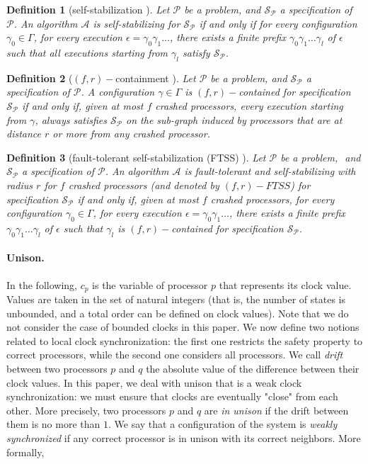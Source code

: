 \documentclass[11pt,english,letterpaper]{article}
\newtheorem{definition}{Definition}
\begin{document}
\begin{definition} [self-stabilization \cite{D74j}] \label{def:self}
Let $\mathcal{P}$ be a problem, and $\mathcal{\mathcal{S}_{P}}$ a specification of $\mathcal{P}$. An algorithm $\mathcal{A}$ is self-stabilizing for $\mathcal{S_{P}}$ if and only if for every configuration  $\gamma_{0}\in\Gamma$, for every execution $\epsilon=\gamma_{0}\gamma_{1}\ldots$, there exists a finite prefix $\gamma_{0}\gamma_{1}\ldots\gamma_{l}$ of $\epsilon$ such that all executions starting from $\gamma_{l}$ satisfy $\mathcal{S_{P}}$.
\end{definition}

\begin{definition} [$(f,r)-$containment \cite{NA02c}]
Let $\mathcal{P}$ be a problem, and $\mathcal{\mathcal{S}_{P}}$ a specification of $\mathcal{P}$. A configuration $\gamma\in\Gamma$ is $(f,r)-$contained for specification $\mathcal{\mathcal{S}_{P}}$ if and only if, given at most $f$ crashed processors, every execution starting from $\gamma$, always satisfies $\mathcal{\mathcal{S}_{P}}$ on the sub-graph induced by processors that are at distance $r$ or more from any crashed processor.
\end{definition}

\begin{definition} [fault-tolerant self-stabilization (FTSS) \cite{AH93c,GP93c}] \label{def:ftss}
Let $\mathcal{P}$ be a problem, $ $ and $\mathcal{\mathcal{S}_{P}}$ a specification of $\mathcal{P}$. An algorithm $\mathcal{A}$ is fault-tolerant and self-stabilizing  with radius $r$ for $f$ crashed processors (and denoted by $(f,r)-FTSS$) for specification $\mathcal{\mathcal{S}_{P}}$ if and only if, given at most $f$ crashed processors, for every configuration  $\gamma_{0}\in\Gamma$, for every execution $\epsilon=\gamma_{0}\gamma_{1}\ldots$, there exists a finite prefix $\gamma_{0}\gamma_{1}\ldots\gamma_{l}$ of $\epsilon$ such that $\gamma_{l}$ is $(f,r)-$contained for specification $\mathcal{\mathcal{S}_{P}}$.
\end{definition}

\paragraph{Unison.} In the following, $c_{p}$ is the variable of processor $p$ that represents its clock value. Values are taken in the set of natural integers (that is, the number of states is unbounded, and a total order can be defined on clock values). Note that we do not consider the case of bounded clocks in this paper. We now define two notions related to local clock synchronization: the first one restricts the safety property to correct processors, while the second one considers all processors. We call \emph{drift} between two processors $p$ and $q$  the absolute value of the difference between their clock values. In this paper, we deal with unison that is a weak clock synchronization: we must ensure that clocks are eventually "close" from each other. More precisely, two processors $p$ and $q$ are \emph{in unison} if the drift between them is no more than $1$. We say that a configuration of the system is \emph{weakly synchronized} if any correct processor is in unison with its correct neighbors. More formally, 
\end{document}
